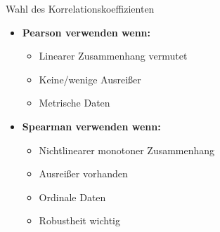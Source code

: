 \begin{remark}{Wahl des Korrelationskoeffizienten}\\
\begin{itemize}
    \item \textbf{Pearson verwenden wenn:}
        \begin{itemize}
            \item Linearer Zusammenhang vermutet
            \item Keine/wenige Ausreißer
            \item Metrische Daten
        \end{itemize}
    \item \textbf{Spearman verwenden wenn:}
        \begin{itemize}
            \item Nichtlinearer monotoner Zusammenhang
            \item Ausreißer vorhanden
            \item Ordinale Daten
            \item Robustheit wichtig
        \end{itemize}
\end{itemize}
\end{remark}